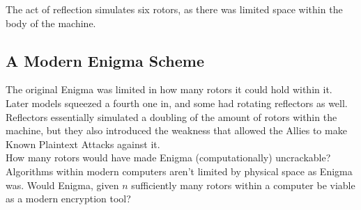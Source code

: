 \documentclass{article}
\begin{document}
The act of reflection simulates six rotors, as there was limited space
within the body of the machine. 

\subsection{A Modern Enigma Scheme}
The original Enigma was limited in how many rotors it could hold within
it. Later models squeezed a fourth one in, and some had rotating
reflectors as well. Reflectors essentially simulated a doubling of the
amount of rotors within the machine, but they also introduced the weakness
that allowed the Allies to make Known Plaintext Attacks against it.\\

How many rotors would have made Enigma (computationally)
uncrackable? Algorithms within modern computers aren't limited by physical
space as Enigma was.
Would Enigma, given $n$ sufficiently many
rotors within a computer be viable as a modern encryption tool?
\end{document}
